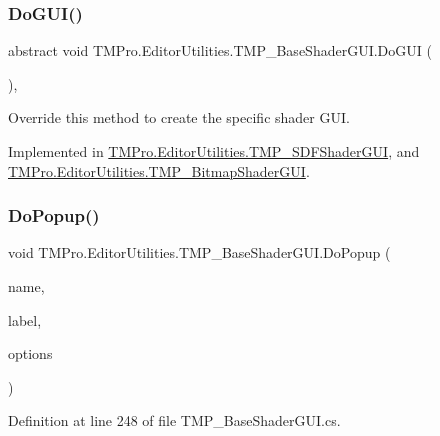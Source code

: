 \subsubsection{\texorpdfstring{DoGUI()}{DoGUI()}}
{\footnotesize\ttfamily abstract void T\+M\+Pro.\+Editor\+Utilities.\+T\+M\+P\+\_\+\+Base\+Shader\+G\+U\+I.\+Do\+G\+UI (\begin{DoxyParamCaption}{ }\end{DoxyParamCaption})\hspace{0.3cm}{\ttfamily [protected]}, {}}



Override this method to create the specific shader G\+UI. 



Implemented in \mbox{\hyperlink{class_t_m_pro_1_1_editor_utilities_1_1_t_m_p___s_d_f_shader_g_u_i_ad54675b667fc314961cedb1beeacd6b4}{T\+M\+Pro.\+Editor\+Utilities.\+T\+M\+P\+\_\+\+S\+D\+F\+Shader\+G\+UI}}, and \mbox{\hyperlink{class_t_m_pro_1_1_editor_utilities_1_1_t_m_p___bitmap_shader_g_u_i_af4f6c43167899462930161b3db412cb5}{T\+M\+Pro.\+Editor\+Utilities.\+T\+M\+P\+\_\+\+Bitmap\+Shader\+G\+UI}}.

\mbox{\label{class_t_m_pro_1_1_editor_utilities_1_1_t_m_p___base_shader_g_u_i_a89a098396bd3d15f1657932e598cd989}} 
\subsubsection{\texorpdfstring{DoPopup()}{DoPopup()}}
{\footnotesize\ttfamily void T\+M\+Pro.\+Editor\+Utilities.\+T\+M\+P\+\_\+\+Base\+Shader\+G\+U\+I.\+Do\+Popup (\begin{DoxyParamCaption}\item[{string}]{name,  }\item[{string}]{label,  }\item[{G\+U\+I\+Content \mbox{[}$\,$\mbox{]}}]{options }\end{DoxyParamCaption})\hspace{0.3cm}{\ttfamily [protected]}}



Definition at line 248 of file T\+M\+P\+\_\+\+Base\+Shader\+G\+U\+I.\+cs.

